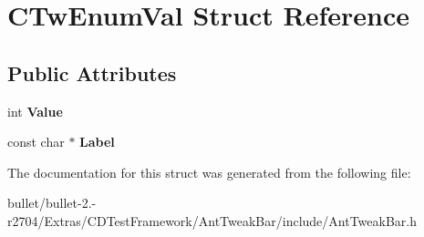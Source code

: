 \hypertarget{struct_c_tw_enum_val}{\section{C\+Tw\+Enum\+Val Struct Reference}
\label{struct_c_tw_enum_val}
}
\subsection*{Public Attributes}
\begin{DoxyCompactItemize}
\item 
\hypertarget{struct_c_tw_enum_val_ab78c8475076e75b5797842df3aebf8dd}{int {\bfseries Value}}\label{struct_c_tw_enum_val_ab78c8475076e75b5797842df3aebf8dd}

\item 
\hypertarget{struct_c_tw_enum_val_a628d9a079774caec505059faa768519b}{const char $\ast$ {\bfseries Label}}\label{struct_c_tw_enum_val_a628d9a079774caec505059faa768519b}

\end{DoxyCompactItemize}


The documentation for this struct was generated from the following file\+:\begin{DoxyCompactItemize}
\item 
bullet/bullet-\/2.-\/r2704/\+Extras/\+C\+D\+Test\+Framework/\+Ant\+Tweak\+Bar/include/Ant\+Tweak\+Bar.\+h\end{DoxyCompactItemize}
